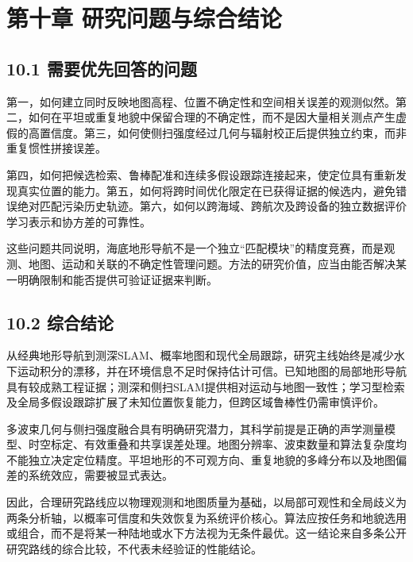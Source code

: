 \hypertarget{ux7b2cux5341ux7ae0-ux7814ux7a76ux95eeux9898ux4e0eux7efcux5408ux7ed3ux8bba}{%
\section{第十章 研究问题与综合结论}\label{ux7b2cux5341ux7ae0-ux7814ux7a76ux95eeux9898ux4e0eux7efcux5408ux7ed3ux8bba}}

\hypertarget{ux9700ux8981ux4f18ux5148ux56deux7b54ux7684ux95eeux9898}{%
\subsection{10.1 需要优先回答的问题}\label{ux9700ux8981ux4f18ux5148ux56deux7b54ux7684ux95eeux9898}}

第一，如何建立同时反映地图高程、位置不确定性和空间相关误差的观测似然。第二，如何在平坦或重复地貌中保留合理的不确定性，而不是因大量相关测点产生虚假的高置信度。第三，如何使侧扫强度经过几何与辐射校正后提供独立约束，而非重复惯性拼接误差。

第四，如何把候选检索、鲁棒配准和连续多假设跟踪连接起来，使定位具有重新发现真实位置的能力。第五，如何将跨时间优化限定在已获得证据的候选内，避免错误绝对匹配污染历史轨迹。第六，如何以跨海域、跨航次及跨设备的独立数据评价学习表示和协方差的可靠性。

这些问题共同说明，海底地形导航不是一个独立``匹配模块''的精度竞赛，而是观测、地图、运动和关联的不确定性管理问题。方法的研究价值，应当由能否解决某一明确限制和能否提供可验证证据来判断。

\hypertarget{ux7efcux5408ux7ed3ux8bba}{%
\subsection{10.2 综合结论}\label{ux7efcux5408ux7ed3ux8bba}}

从经典地形导航到测深SLAM、概率地图和现代全局跟踪，研究主线始终是减少水下运动积分的漂移，并在环境信息不足时保持估计可信。已知地图的局部地形导航具有较成熟工程证据；测深和侧扫SLAM提供相对运动与地图一致性；学习型检索及全局多假设跟踪扩展了未知位置恢复能力，但跨区域鲁棒性仍需审慎评价。

多波束几何与侧扫强度融合具有明确研究潜力，其科学前提是正确的声学测量模型、时空标定、有效重叠和共享误差处理。地图分辨率、波束数量和算法复杂度均不能独立决定定位精度。平坦地形的不可观方向、重复地貌的多峰分布以及地图偏差的系统效应，需要被显式表达。

因此，合理研究路线应以物理观测和地图质量为基础，以局部可观性和全局歧义为两条分析轴，以概率可信度和失效恢复为系统评价核心。算法应按任务和地貌选用或组合，而不是将某一种陆地或水下方法视为无条件最优。这一结论来自多条公开研究路线的综合比较，不代表未经验证的性能结论。

